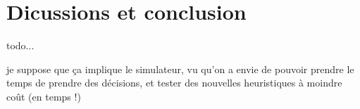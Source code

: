 \section{Dicussions et conclusion}

\begin{todo}
todo...

je suppose que ça implique le simulateur, vu qu'on a envie de pouvoir prendre le temps de prendre des décisions, et tester des nouvelles heuristiques à moindre coût (en temps !)
\end{todo}

